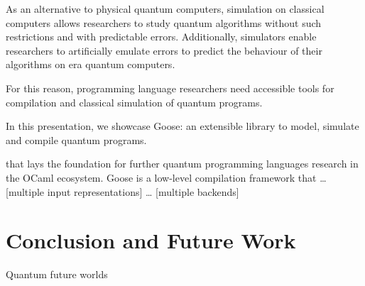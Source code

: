 \documentclass[a4paper]{easychair}
\begin{document}
As an alternative to physical quantum computers, simulation on classical computers allows researchers to study quantum algorithms without such restrictions and with predictable errors. Additionally, simulators enable researchers to artificially emulate errors to predict the behaviour of their algorithms on \nisq era quantum computers.

For this reason, programming language researchers need accessible tools for compilation and classical simulation of quantum programs.

In this presentation, we showcase Goose: an extensible library to model, simulate and compile quantum programs.

that lays the foundation for further quantum programming languages research in the OCaml ecosystem. Goose is a low-level compilation framework that … [multiple input representations] … [multiple backends]


\section{Conclusion and Future Work}

Quantum future worlds





\end{document}
